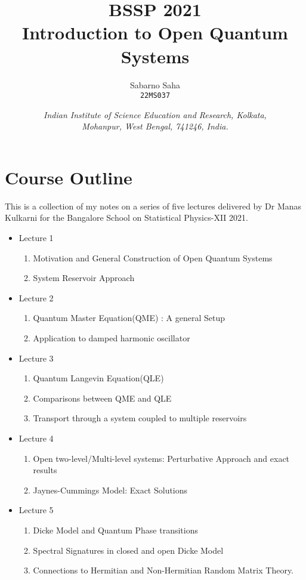 \documentclass{scrartcl}
\title{
        \Large\textsc{BSSP 2021} \\
        \vspace{10pt}
        \Huge \textbf{Introduction to Open Quantum Systems} \\
}
\author{Sabarno Saha \\ \texttt{22MS037}}
\date{\normalsize
        \textit{Indian Institute of Science Education and Research, Kolkata, \\
        Mohanpur, West Bengal, 741246, India.}
}
\begin{document}
\maketitle
\tableofcontents
\pagebreak{}
\section*{Course Outline}
This is a collection of my notes on a series of five lectures delivered by Dr Manas Kulkarni for the Bangalore School on Statistical Physics-XII 2021.
\begin{itemize}
    \item Lecture 1
    \begin{enumerate}
        \item Motivation and General Construction of Open Quantum Systems
        \item System Reservoir Approach
    \end{enumerate}
    \item Lecture 2
    \begin{enumerate}
        \item Quantum Master Equation(QME) : A general Setup
        \item Application to damped harmonic oscillator
    \end{enumerate}
    \item Lecture 3
    \begin{enumerate}
        \item Quantum Langevin Equation(QLE)
        \item Comparisons between QME and QLE
        \item Transport through a system coupled to multiple reservoirs
    \end{enumerate}
    \item Lecture 4
    \begin{enumerate}
        \item Open two-level/Multi-level systems: Perturbative Approach and exact results
        \item Jaynes-Cummings Model: Exact Solutions
    \end{enumerate}
    \item Lecture 5
    \begin{enumerate}
        \item Dicke Model and Quantum Phase transitions
        \item Spectral Signatures in closed and open Dicke Model
    \item Connections to Hermitian and Non-Hermitian Random Matrix Theory.
    \end{enumerate}
\end{itemize}
\end{document}

